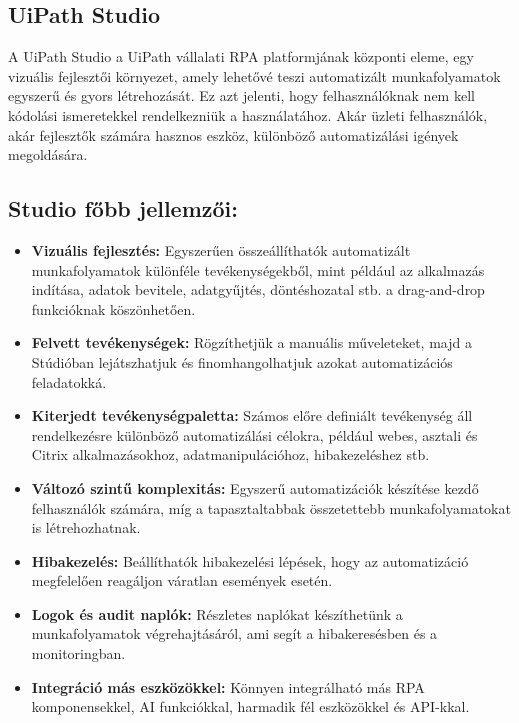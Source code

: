 \documentclass[
]{thesis-ekf}
\theoremstyle{definition}
\theoremstyle{remark}
\begin{document}
\subsection{ UiPath Studio}
A UiPath Studio a UiPath vállalati RPA platformjának központi eleme, egy vizuális fejlesztői környezet, amely lehetővé teszi automatizált munkafolyamatok egyszerű és gyors létrehozását. Ez azt jelenti, hogy felhasználóknak nem kell kódolási ismeretekkel rendelkezniük a használatához. Akár üzleti felhasználók, akár fejlesztők számára hasznos eszköz, különböző automatizálási igények megoldására.
\subsection*{Studio főbb jellemzői:}
	\begin{itemize}
		\item \textbf{Vizuális fejlesztés:} Egyszerűen összeállíthatók automatizált munkafolyamatok különféle tevékenységekből, mint például az alkalmazás indítása, adatok bevitele, adatgyűjtés, döntéshozatal stb. a drag-and-drop funkcióknak köszönhetően.
		
		\item \textbf{Felvett tevékenységek:} Rögzíthetjük a manuális műveleteket, majd a Stúdióban lejátszhatjuk és finomhangolhatjuk azokat automatizációs feladatokká.
				
		\item \textbf{Kiterjedt tevékenységpaletta:} Számos előre definiált tevékenység áll rendelkezésre különböző automatizálási célokra, például webes, asztali és Citrix alkalmazásokhoz, adatmanipulációhoz, hibakezeléshez stb.
		
		
		\item \textbf{Változó szintű komplexitás:} Egyszerű automatizációk készítése kezdő felhasználók számára, míg a tapasztaltabbak összetettebb munkafolyamatokat is létrehozhatnak.
		
		\item \textbf{Hibakezelés:} Beállíthatók hibakezelési lépések, hogy az automatizáció megfelelően reagáljon váratlan események esetén.
		
		\item \textbf{Logok és audit naplók:} Részletes naplókat készíthetünk a munkafolyamatok végrehajtásáról, ami segít a hibakeresésben és a monitoringban.
		
		\item \textbf{Integráció más eszközökkel:} Könnyen integrálható más RPA komponensekkel, AI funkciókkal, harmadik fél eszközökkel és API-kkal.
		
	\end{itemize}
\end{document}
